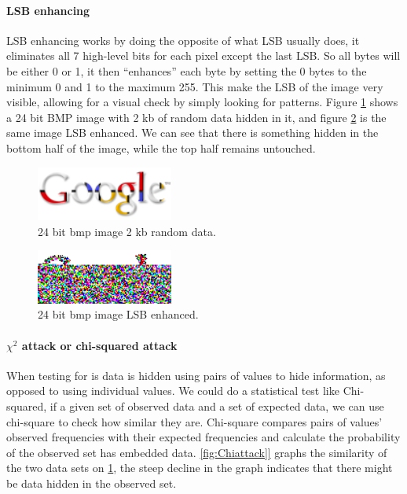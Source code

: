 
\paragraph*{LSB enhancing}
LSB enhancing works by doing the opposite of what LSB usually does, it eliminates all 7 high-level bits for each pixel except the last LSB. 
So all bytes will be either 0 or 1, it then ``enhances'' each byte by setting the 0 bytes to the minimum 0 and 1 to the maximum 255.
This make the LSB of the image very visible, allowing for a visual check by simply looking for patterns.
Figure \ref{fig:hiddengoodle} shows a 24 bit BMP image with 2 kb of random data hidden in it, and figure \ref{fig:LSBenhanced} is the same image LSB enhanced.
We can see that there is something hidden in the bottom half of the image, while the top half remains untouched\citep{Westfeld2000}.

\begin{figure}
	\centering
	\includegraphics[width=0.4\textwidth]{figures/google.png}
	\caption{24 bit bmp image 2 kb random data.}
	\label{fig:hiddengoodle}
\end{figure}

\begin{figure}
	\centering
	\includegraphics[width=0.4\textwidth]{figures/LSBenhanced.png}
	\caption{24 bit bmp image LSB enhanced.}
	\label{fig:LSBenhanced}
\end{figure}

\paragraph*{$\chi^2$ attack or chi-squared attack}
When testing for is data is hidden using pairs of values to hide information, as opposed to using individual values.
We could do a statistical test like Chi-squared, if a given set of observed data and a set of expected data, we can use chi-square to check how similar they are.
Chi-square compares pairs of values' observed frequencies with their expected frequencies and calculate the probability of the observed set has embedded data.
\ref{fig:Chiattack]} graphs the similarity of the two data sets on \ref{fig:hiddengoodle}, the steep decline in the graph indicates that there might be data hidden in the observed set.

